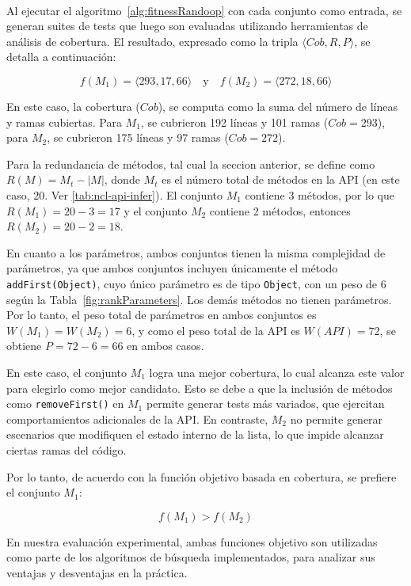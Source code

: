 \\

Al ejecutar el algoritmo~\ref{alg:fitnessRandoop} con cada conjunto como entrada, se generan suites de tests que luego son evaluadas utilizando herramientas de análisis de cobertura. 
El resultado, expresado como la tripla \( \langle Cob, R, P \rangle \), se detalla a continuación:

\[
f(M_1) = \langle 293, 17, 66 \rangle \quad \text{y} \quad f(M_2) = \langle 272, 18, 66 \rangle
\]

En este caso, la cobertura  (\(Cob\)), se computa como la suma del número de líneas y ramas cubiertas.
Para \( M_1 \), se cubrieron 192 líneas y 101 ramas (\(Cob = 293\)), para \( M_2 \), se cubrieron 175 líneas y 97 ramas (\(Cob = 272\)).

Para la redundancia de métodos, tal cual la seccion anterior, se define como \( R(M) = M_t - |M| \), donde \( M_t \) es el número total de métodos en la API (en este caso, 20. Ver \ref{tab:ncl-api-infer}). 
El conjunto \( M_1 \) contiene 3 métodos, por lo que \( R(M_1) = 20 - 3 = 17 \) y el conjunto \( M_2 \) contiene 2 métodos, entonces \( R(M_2) = 20 - 2 = 18 \).

En cuanto a los parámetros, ambos conjuntos tienen la misma complejidad de parámetros, ya que ambos conjuntos incluyen únicamente el método \texttt{addFirst(Object)}, cuyo único parámetro es de tipo \texttt{Object}, con un peso de 6 según la Tabla~\ref{fig:rankParameters}. 
Los demás métodos no tienen parámetros. Por lo tanto, el peso total de parámetros en ambos conjuntos es \( W(M_1) = W(M_2) = 6 \), y como el peso total de la API es \( W(API) = 72 \), se obtiene \( P = 72 - 6 = 66 \) en ambos casos.

En este caso, el conjunto \( M_1 \) logra una mejor cobertura, lo cual alcanza este valor para elegirlo como mejor candidato. 
Esto se debe a que la inclusión de métodos como \texttt{removeFirst()} en \( M_1 \) permite generar tests más variados, que ejercitan comportamientos adicionales de la API. 
En contraste, \( M_2 \) no permite generar escenarios que modifiquen el estado interno de la lista, lo que impide alcanzar ciertas ramas del código.

Por lo tanto, de acuerdo con la función objetivo basada en cobertura, se prefiere el conjunto \( M_1 \):

\[
f(M_1) > f(M_2)
\]


En nuestra evaluación experimental, ambas funciones objetivo son utilizadas como
parte de los algoritmos de búsqueda implementados, para analizar sus ventajas y
desventajas en la práctica. 



